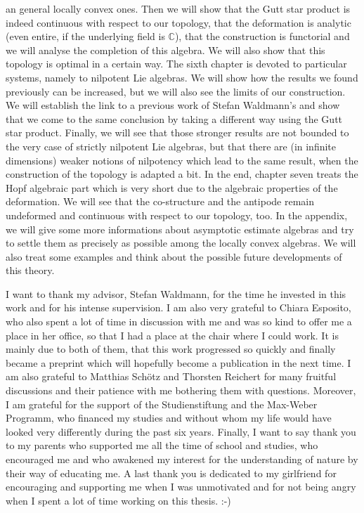 an general locally convex ones. Then we will show that the Gutt star product is 
indeed continuous with respect to our topology, that the deformation is 
analytic (even entire, if the underlying field is $\mathbb{C}$), that the 
construction is functorial and we will analyse the completion of this algebra. 
We will also show that this topology is optimal in a certain way.
The sixth chapter is devoted to particular systems, namely to nilpotent Lie 
algebras. We will show how the results we found previously can be increased, 
but we will also see the limits of our construction. We will establish 
the link to a previous work of Stefan Waldmann's and show that we come to the 
same conclusion by taking a different way using the Gutt star product. Finally, 
we will see that those stronger results are not bounded to the very case of 
strictly nilpotent Lie algebras, but that there are (in infinite dimensions) 
weaker notions of nilpotency which lead to the same result, when the 
construction of the topology is adapted a bit.
In the end, chapter seven treats the Hopf algebraic part which is very short 
due to the algebraic properties of the deformation. We will see that 
the co-structure and the antipode remain undeformed and continuous with respect 
to our topology, too.
In the appendix, we will give some more informations about asymptotic estimate 
algebras and try to settle them as precisely as possible among the locally 
convex algebras. We will also treat some examples and think about the possible 
future developments of this theory.


I want to thank my advisor, Stefan Waldmann, for the time he invested in this 
work and for his intense supervision. I am also very grateful to Chiara 
Esposito, who also spent a lot of time in discussion with me and was so kind to 
offer me a place in her office, so that I had a place at the chair where I 
could work. It is mainly due to both of them, that this work progressed so 
quickly and finally became a preprint \cite{esposito.stapor.waldmann:2015a:pre} 
which will hopefully become a publication in the next time. I am also grateful 
to Matthias Sch\"otz and Thorsten Reichert for many fruitful discussions 
and their patience with me bothering them with questions. Moreover, I am 
grateful for the support of the Studienstiftung and the Max-Weber Programm, who 
financed my studies and without whom my life would have looked very 
differently during the past six years. Finally, I want to 
say thank you to my parents who supported me all the time of school and 
studies, who encouraged me and who awakened my interest for the understanding 
of nature by their way of educating me. A last thank you is dedicated to my 
girlfriend for encouraging and supporting me when I was unmotivated and for not 
being angry when I spent a lot of time working on this thesis. :-)

